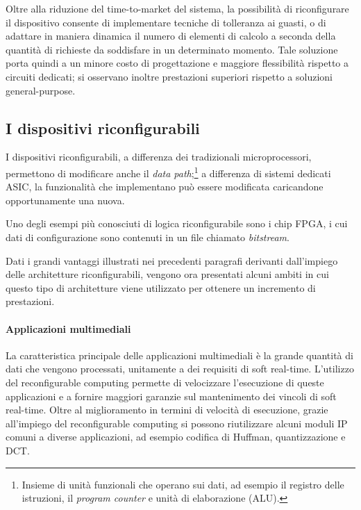Oltre alla riduzione del time-to-market del sistema, la possibilit\`a di riconfigurare
il dispositivo consente di implementare tecniche di tolleranza ai guasti, o di adattare
in maniera dinamica il numero di elementi di calcolo a seconda della quantit\`a di richieste
da soddisfare in un determinato momento. Tale soluzione porta quindi a un minore costo di progettazione
e maggiore flessibilità rispetto a circuiti dedicati; si osservano inoltre prestazioni superiori
rispetto a soluzioni general-purpose.



\subsection{I dispositivi riconfigurabili}
I dispositivi riconfigurabili, a differenza dei tradizionali microprocessori, permettono di modificare
anche il \emph{data path};\footnote{Insieme di unit\`a funzionali che operano sui dati, ad esempio il
registro delle istruzioni, il \emph{program counter} e unit\`a di elaborazione (\acs{ALU}).}
a differenza di sistemi dedicati \ac{ASIC}, la funzionalit\`a che implementano pu\`o essere
modificata caricandone opportunamente una nuova.

Uno degli esempi pi\`u conosciuti di logica riconfigurabile sono i chip \ac{FPGA}, i cui dati di
configurazione sono contenuti in un file chiamato \emph{bitstream}.


Dati i grandi vantaggi illustrati nei precedenti paragrafi derivanti dall'impiego delle
architetture riconfigurabili, vengono ora presentati alcuni ambiti in cui questo tipo
di architetture viene utilizzato per ottenere un incremento di prestazioni.

\paragraph{Applicazioni multimediali}
La caratteristica principale delle applicazioni multimediali è la grande quantità di dati che
vengono processati, unitamente a dei requisiti di soft real-time. L'utilizzo del reconfigurable
computing permette di velocizzare l'esecuzione di queste applicazioni e a fornire maggiori garanzie
sul mantenimento dei vincoli di soft real-time. Oltre al miglioramento
in termini di velocità di esecuzione, grazie all'impiego del reconfigurable computing si possono
riutilizzare alcuni moduli \ac{IP} comuni a diverse applicazioni, ad esempio codifica di
Huffman, quantizzazione e \ac{DCT}.

